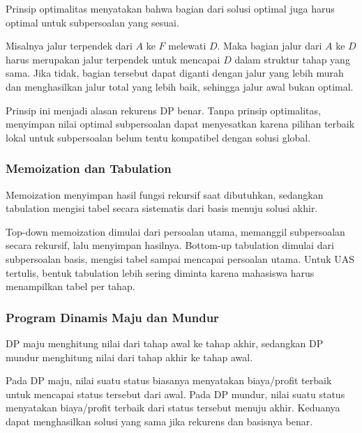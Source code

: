\begin{jawab}
Prinsip optimalitas menyatakan bahwa bagian dari solusi optimal juga harus optimal untuk subpersoalan yang sesuai.
\end{jawab}

Misalnya jalur terpendek dari $A$ ke $F$ melewati $D$. Maka bagian jalur dari $A$ ke $D$ harus merupakan jalur terpendek untuk mencapai $D$ dalam struktur tahap yang sama. Jika tidak, bagian tersebut dapat diganti dengan jalur yang lebih murah dan menghasilkan jalur total yang lebih baik, sehingga jalur awal bukan optimal.

Prinsip ini menjadi alasan rekurens DP benar. Tanpa prinsip optimalitas, menyimpan nilai optimal subpersoalan dapat menyesatkan karena pilihan terbaik lokal untuk subpersoalan belum tentu kompatibel dengan solusi global.

\subsubsection{Memoization dan Tabulation}

\begin{jawab}
Memoization menyimpan hasil fungsi rekursif saat dibutuhkan, sedangkan tabulation mengisi tabel secara sistematis dari basis menuju solusi akhir.
\end{jawab}

Top-down memoization dimulai dari persoalan utama, memanggil subpersoalan secara rekursif, lalu menyimpan hasilnya. Bottom-up tabulation dimulai dari subpersoalan basis, mengisi tabel sampai mencapai persoalan utama. Untuk UAS tertulis, bentuk tabulation lebih sering diminta karena mahasiswa harus menampilkan tabel per tahap.

\subsubsection{Program Dinamis Maju dan Mundur}

\begin{jawab}
DP maju menghitung nilai dari tahap awal ke tahap akhir, sedangkan DP mundur menghitung nilai dari tahap akhir ke tahap awal.
\end{jawab}

Pada DP maju, nilai suatu status biasanya menyatakan biaya/profit terbaik untuk mencapai status tersebut dari awal. Pada DP mundur, nilai suatu status menyatakan biaya/profit terbaik dari status tersebut menuju akhir. Keduanya dapat menghasilkan solusi yang sama jika rekurens dan basisnya benar.

